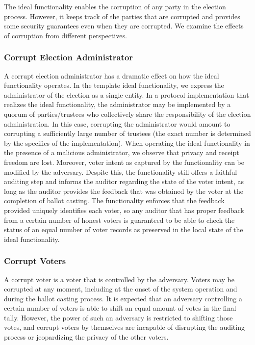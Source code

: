 The ideal functionality enables the corruption of any party in the
election process. However, it keeps track of the parties that are
corrupted and provides some security guarantees even when they are
corrupted. We examine the effects of corruption from different
perspectives.

\subsubsection{Corrupt Election Administrator}

A corrupt election administrator has a dramatic effect on how the
ideal functionality operates. In the template ideal functionality, we
express the administrator of the election as a single entity. In a
protocol implementation that realizes the ideal functionality, the
administrator may be implemented by a quorum of parties/trustees who
collectively share the responsibility of the election administration.
In this case, corrupting the administrator would amount to corrupting
a sufficiently large number of trustees (the exact number is
determined by the specifics of the implementation). When operating the
ideal functionality in the presence of a malicious administrator, we
observe that privacy and receipt freedom are lost. Moreover, voter
intent as captured by the functionality can be modified by the
adversary. Despite this, the functionality still offers a faithful
auditing step and informs the auditor regarding the state of the voter
intent, as long as the auditor provides the feedback that was obtained
by the voter at the completion of ballot casting. The functionality
enforces that the feedback provided uniquely identifies each voter, so
any auditor that has proper feedback from a certain number of honest
voters is guaranteed to be able to check the status of an equal number
of voter records as preserved in the local state of the ideal
functionality.

\subsubsection{Corrupt Voters} 

A corrupt voter is a voter that is controlled by the adversary. Voters
may be corrupted at any moment, including at the onset of the system
operation and during the ballot casting process. It is expected that
an adversary controlling a certain number of voters is able to shift
an equal amount of votes in the final tally. However, the power of
such an adversary is restricted to shifting those votes, and corrupt
voters by themselves are incapable of disrupting the auditing process
or jeopardizing the privacy of the other voters.

